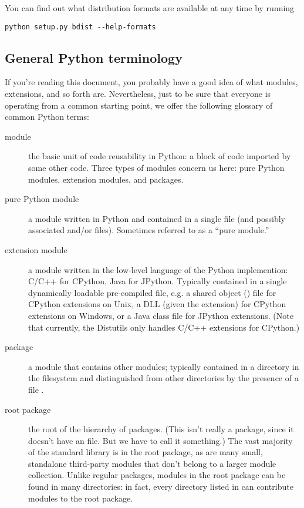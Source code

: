 \documentclass{howto}
\begin{document}
You can find out what distribution formats are available at any time by
running
\begin{verbatim}
python setup.py bdist --help-formats
\end{verbatim}


\subsection{General Python terminology}
\label{python-terms}

If you're reading this document, you probably have a good idea of what
modules, extensions, and so forth are.  Nevertheless, just to be sure
that everyone is operating from a common starting point, we offer the
following glossary of common Python terms:
\begin{description}
\item[module] the basic unit of code reusability in Python: a block of
  code imported by some other code.  Three types of modules concern us
  here: pure Python modules, extension modules, and packages.
\item[pure Python module] a module written in Python and contained in a
  single  file (and possibly associated  and/or
   files).  Sometimes referred to as a ``pure module.''
\item[extension module] a module written in the low-level language of
  the Python implemention: C/C++ for CPython, Java for JPython.
  Typically contained in a single dynamically loadable pre-compiled
  file, e.g. a shared object () file for CPython extensions on
  Unix, a DLL (given the  extension) for CPython extensions
  on Windows, or a Java class file for JPython extensions.  (Note that
  currently, the Distutils only handles C/C++ extensions for CPython.)
\item[package] a module that contains other modules; typically contained
  in a directory in the filesystem and distinguished from other
  directories by the presence of a file .
\item[root package] the root of the hierarchy of packages.  (This isn't
  really a package, since it doesn't have an 
  file.  But we have to call it something.)  The vast majority of the
  standard library is in the root package, as are many small, standalone
  third-party modules that don't belong to a larger module collection.
  Unlike regular packages, modules in the root package can be found in
  many directories: in fact, every directory listed in 
  can contribute modules to the root package.
\end{description}
\end{document}
